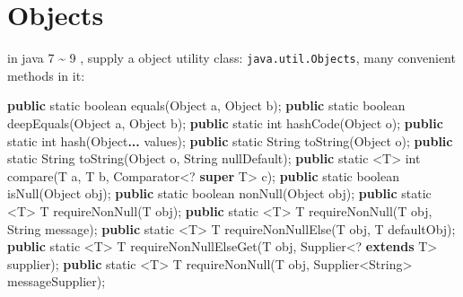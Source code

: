 \documentclass[
]{book}
\newenvironment{Shaded}{\begin{snugshade}}{\end{snugshade}}
\newcommand{\BuiltInTok}[1]{#1}
\newcommand{\DataTypeTok}[1]{\textcolor[rgb]{0.13,0.29,0.53}{#1}}
\newcommand{\FunctionTok}[1]{\textcolor[rgb]{0.00,0.00,0.00}{#1}}
\newcommand{\KeywordTok}[1]{\textcolor[rgb]{0.13,0.29,0.53}{\textbf{#1}}}
\newcommand{\NormalTok}[1]{#1}
\begin{document}
\hypertarget{langx-java_references_utils_Objects}{%
\section{Objects}\label{langx-java_references_utils_Objects}}

in java 7 \textasciitilde{} 9 , supply a object utility class: \texttt{java.util.Objects}, many convenient methods in it:

\begin{Shaded}
\begin{Highlighting}[]
\KeywordTok{public} \DataTypeTok{static} \DataTypeTok{boolean} \FunctionTok{equals}\NormalTok{(}\BuiltInTok{Object}\NormalTok{ a, }\BuiltInTok{Object}\NormalTok{ b);}
\KeywordTok{public} \DataTypeTok{static} \DataTypeTok{boolean} \FunctionTok{deepEquals}\NormalTok{(}\BuiltInTok{Object}\NormalTok{ a, }\BuiltInTok{Object}\NormalTok{ b);}
\KeywordTok{public} \DataTypeTok{static} \DataTypeTok{int} \FunctionTok{hashCode}\NormalTok{(}\BuiltInTok{Object}\NormalTok{ o);}
\KeywordTok{public} \DataTypeTok{static} \DataTypeTok{int} \FunctionTok{hash}\NormalTok{(}\BuiltInTok{Object}\KeywordTok{... }\NormalTok{values);}
\KeywordTok{public} \DataTypeTok{static} \BuiltInTok{String} \FunctionTok{toString}\NormalTok{(}\BuiltInTok{Object}\NormalTok{ o);}
\KeywordTok{public} \DataTypeTok{static} \BuiltInTok{String} \FunctionTok{toString}\NormalTok{(}\BuiltInTok{Object}\NormalTok{ o, }\BuiltInTok{String}\NormalTok{ nullDefault);}
\KeywordTok{public} \DataTypeTok{static}\NormalTok{ <T> }\DataTypeTok{int} \FunctionTok{compare}\NormalTok{(T a, T b, }\BuiltInTok{Comparator}\NormalTok{<? }\KeywordTok{super}\NormalTok{ T> c);}
\KeywordTok{public} \DataTypeTok{static} \DataTypeTok{boolean} \FunctionTok{isNull}\NormalTok{(}\BuiltInTok{Object}\NormalTok{ obj);}
\KeywordTok{public} \DataTypeTok{static} \DataTypeTok{boolean} \FunctionTok{nonNull}\NormalTok{(}\BuiltInTok{Object}\NormalTok{ obj);}
\KeywordTok{public} \DataTypeTok{static}\NormalTok{ <T> T }\FunctionTok{requireNonNull}\NormalTok{(T obj);}
\KeywordTok{public} \DataTypeTok{static}\NormalTok{ <T> T }\FunctionTok{requireNonNull}\NormalTok{(T obj, }\BuiltInTok{String}\NormalTok{ message);}
\KeywordTok{public} \DataTypeTok{static}\NormalTok{ <T> T }\FunctionTok{requireNonNullElse}\NormalTok{(T obj, T defaultObj);}
\KeywordTok{public} \DataTypeTok{static}\NormalTok{ <T> T }\FunctionTok{requireNonNullElseGet}\NormalTok{(T obj, Supplier<? }\KeywordTok{extends}\NormalTok{ T> supplier);}
\KeywordTok{public} \DataTypeTok{static}\NormalTok{ <T> T }\FunctionTok{requireNonNull}\NormalTok{(T obj, Supplier<}\BuiltInTok{String}\NormalTok{> messageSupplier);}

\end{Highlighting}
\end{Shaded}
\end{document}
